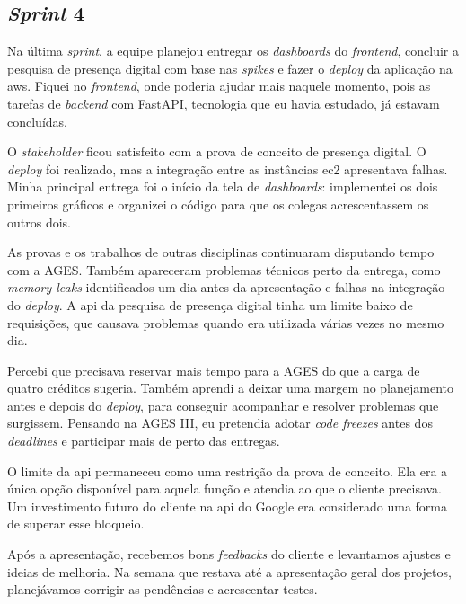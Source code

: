 \subsection{\textit{Sprint} 4}

Na última \textit{sprint}, a equipe planejou entregar os \textit{dashboards}
do \textit{frontend}, concluir a pesquisa de presença digital com base nas
\textit{spikes} e fazer o \textit{deploy} da aplicação na \ac{aws}. Fiquei no
\textit{frontend}, onde poderia ajudar mais naquele momento, pois as tarefas de
\textit{backend} com FastAPI, tecnologia que eu havia estudado, já estavam
concluídas.

O \textit{stakeholder} ficou satisfeito com a prova de conceito de presença
digital. O \textit{deploy} foi realizado, mas a integração entre as instâncias
\ac{ec2} \cite{aws-ec2-docs} apresentava falhas. Minha principal entrega foi o
início da tela de \textit{dashboards}: implementei os dois primeiros gráficos
e organizei o código para que os colegas acrescentassem os outros dois.

As provas e os trabalhos de outras disciplinas continuaram disputando tempo com
a AGES. Também apareceram problemas técnicos perto da entrega, como
\textit{memory leaks} identificados um dia antes da apresentação e falhas na
integração do \textit{deploy}. A \ac{api} da pesquisa de presença digital tinha
um limite baixo de requisições, que causava problemas quando era utilizada
várias vezes no mesmo dia.

Percebi que precisava reservar mais tempo para a AGES do que a carga de quatro
créditos sugeria. Também aprendi a deixar uma margem no planejamento antes e
depois do \textit{deploy}, para conseguir acompanhar e resolver problemas que
surgissem. Pensando na AGES III, eu pretendia adotar \textit{code freezes} antes
dos \textit{deadlines} e participar mais de perto das entregas.

O limite da \ac{api} permaneceu como uma restrição da prova de conceito. Ela era
a única opção disponível para aquela função e atendia ao que o cliente precisava.
Um investimento futuro do cliente na \ac{api} do Google era considerado uma
forma de superar esse bloqueio.

Após a apresentação, recebemos bons \textit{feedbacks} do cliente e levantamos
ajustes e ideias de melhoria. Na semana que restava até a apresentação geral
dos projetos, planejávamos corrigir as pendências e acrescentar testes.
